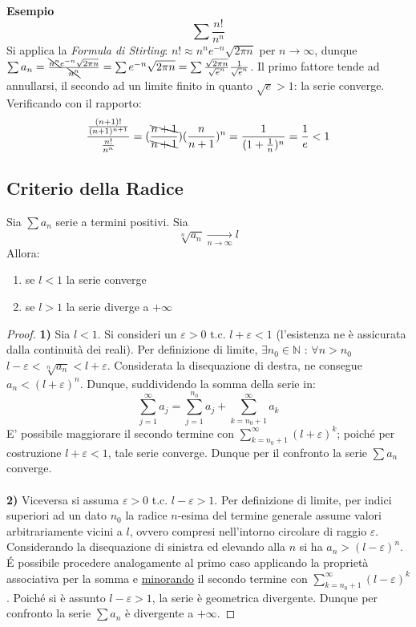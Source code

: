 \documentclass[10pt, oneside]{book}
\theoremstyle{plain}
\begin{document}
\textbf{Esempio}
\begin{equation*}
    \sum \frac{n!}{n^n}
\end{equation*}
Si applica la \textit{Formula di Stirling}: $n! \approx n^n e^{-n} \sqrt{2 \pi n}$ per $n \rightarrow \infty$, dunque $\sum a_n = \frac{\bcancel{n^n}e^{-n}\sqrt{2 \pi n}}{\bcancel{n^n}} = \sum e^{-n}\sqrt{2 \pi n} = \sum \frac{\sqrt{2 \pi n}}{\sqrt{e}^n} \frac{1}{\sqrt{e}^n}$. Il primo fattore tende ad annullarsi, il secondo ad un limite finito in quanto $\sqrt{e} > 1$: la serie converge.
\\Verificando con il rapporto: 
\begin{equation*}
    \frac{\frac{(n+1)!}{(n+1)^{n+1}}}{\frac{n!}{n^n}} = (\frac{\bcancel{n+1}}{\bcancel{n+1}})(\frac{n}{n+1})^n = \frac{1}{(1+\frac{1}{n})^n} = \frac{1}{e} < 1
\end{equation*}

\subsection{Criterio della Radice}
\begin{ther}
Sia $\sum a_n$ serie a termini positivi. Sia
\[\sqrt[n]{a_n} \xrightarrow[n \rightarrow \infty]{} l\]
Allora:
\begin{enumerate}
    \item se $l < 1$ la serie converge
    \item se $l > 1$ la serie diverge a $+ \infty$
\end{enumerate}
\end{ther}
\begin{proof}
\textbf{1)} Sia $l < 1$. Si consideri un $\varepsilon > 0$ t.c. $l + \varepsilon < 1$ (l'esistenza ne è assicurata dalla continuità dei reali). Per definizione di limite, $\exists n_0 \in \mathbb{N}$ : $\forall n > n_0$ $l - \varepsilon < \sqrt[n]{a_n} < l + \varepsilon$. Considerata la disequazione di destra, ne consegue $a_n < (l + \varepsilon)^n$. Dunque, suddividendo la somma della serie in:
\[\sum \limits_{j=1}^{\infty} a_j = \sum \limits_{j=1}^{n_0} a_j + \sum \limits_{k=n_0 + 1}^{\infty} a_k\]
E' possibile maggiorare il secondo termine con $\sum \limits_{k=n_0 + 1}^{\infty} (l + \varepsilon)^k$; poiché per costruzione $l + \varepsilon < 1$, tale serie converge. Dunque per il confronto la serie $\sum a_n$ converge.
\\~\\\textbf{2)} Viceversa si assuma $\varepsilon > 0$ t.c. $l - \varepsilon > 1$. Per definizione di limite, per indici superiori ad un dato $n_0$ la radice $n$-esima del termine generale assume valori arbitrariamente vicini a $l$, ovvero compresi nell'intorno circolare di raggio $\varepsilon$. Considerando la disequazione di sinistra ed elevando alla $n$ si ha $a_n > (l - \varepsilon)^n$. \'E possibile procedere analogamente al primo caso applicando la proprietà associativa per la somma e \underline{minorando} il secondo termine con $\sum_{k= n_0 + 1}^{\infty} (l - \varepsilon)^k$. Poiché si è assunto $l - \varepsilon > 1$, la serie è geometrica divergente. Dunque per confronto la serie $\sum a_n$ è divergente a $+ \infty$.
\end{proof}
\end{document}
